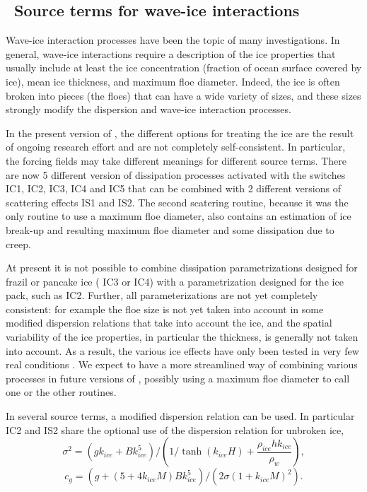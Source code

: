 \vssub
\subsection{~Source terms for wave-ice interactions}
\vsssub


Wave-ice interaction processes have been the topic of many investigations. In general, wave-ice interactions require 
a description of the ice properties that usually include at least the ice concentration (fraction of ocean surface covered by ice), 
mean ice thickness, and maximum floe diameter. Indeed, the ice is often broken into pieces (the floes) that can have a wide variety of sizes, 
and these sizes strongly modify the dispersion and wave-ice interaction processes. 


In the present version of \ww, the different options 
for treating the ice are the result of ongoing research effort and are not completely self-consistent. In particular, the forcing fields may take 
different meanings for different source terms. There are now 5 different 
version of dissipation processes activated with the switches {\code IC1}, {\code IC2},  {\code IC3}, {\code IC4} and {\code IC5} that can be combined with 2 
different versions of scattering effects  {\code IS1} and {\code IS2}. The second scatering routine, because it was the only routine 
to use a maximum floe diameter, also contains an estimation of 
ice break-up and resulting maximum floe diameter and some dissipation due to creep. 


At present it is not possible to combine dissipation parametrizations designed for frazil or pancake ice (  {\code IC3} or {\code IC4}) with 
a parametrization designed for the ice pack, such  as {\code IC2}. Further, all parameterizations are not yet completely consistent: 
for example the floe size is not yet taken into account in some modified dispersion relations that take into account the ice, and 
the spatial variability of the ice properties, in particular the thickness, is generally not taken into account. As a result, 
the various ice effects have only been tested in very  few real conditions \citep[e.g.][]{art:Aea16}.
We expect to have a more streamlined way of combining various processes in future versions of \ww, possibly using 
a maximum floe diameter to call one or the other routines. 


In several source terms, a modified dispersion relation can be used. In particular {\code IC2} and {\code IS2} share 
the optional use of the \cite{art:LMC88} dispersion relation for unbroken ice, 
\begin{equation}
\sigma^2 =  \left(gk_{ice} + B k_{ice}^5\right)  / \left(1/\tanh ( k_{ice}H) +\frac{\rho_{ice}  h k_{ice}} {\rho_{w} }\right),
\end{equation}
\begin{equation}
c_g =  (g+(5 + 4 k_{ice} M)Bk_{ice}^5)/(2\sigma(1+k_{ice}M)^2).
\end{equation}

